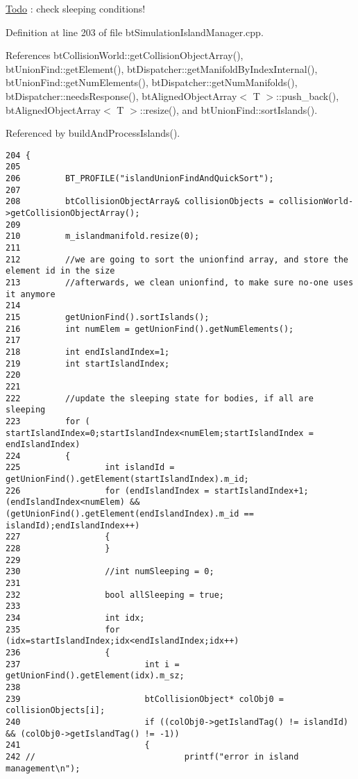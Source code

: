 \begin{Desc}
\item[\hyperlink{todo__todo000016}{Todo}]: check sleeping conditions! \end{Desc}


Definition at line 203 of file btSimulationIslandManager.cpp.

References btCollisionWorld::getCollisionObjectArray(), btUnionFind::getElement(), btDispatcher::getManifoldByIndexInternal(), btUnionFind::getNumElements(), btDispatcher::getNumManifolds(), btDispatcher::needsResponse(), btAlignedObjectArray$<$ T $>$::push\_\-back(), btAlignedObjectArray$<$ T $>$::resize(), and btUnionFind::sortIslands().

Referenced by buildAndProcessIslands().

\begin{Code}\begin{verbatim}204 {
205 
206         BT_PROFILE("islandUnionFindAndQuickSort");
207         
208         btCollisionObjectArray& collisionObjects = collisionWorld->getCollisionObjectArray();
209 
210         m_islandmanifold.resize(0);
211 
212         //we are going to sort the unionfind array, and store the element id in the size
213         //afterwards, we clean unionfind, to make sure no-one uses it anymore
214         
215         getUnionFind().sortIslands();
216         int numElem = getUnionFind().getNumElements();
217 
218         int endIslandIndex=1;
219         int startIslandIndex;
220 
221 
222         //update the sleeping state for bodies, if all are sleeping
223         for ( startIslandIndex=0;startIslandIndex<numElem;startIslandIndex = endIslandIndex)
224         {
225                 int islandId = getUnionFind().getElement(startIslandIndex).m_id;
226                 for (endIslandIndex = startIslandIndex+1;(endIslandIndex<numElem) && (getUnionFind().getElement(endIslandIndex).m_id == islandId);endIslandIndex++)
227                 {
228                 }
229 
230                 //int numSleeping = 0;
231 
232                 bool allSleeping = true;
233 
234                 int idx;
235                 for (idx=startIslandIndex;idx<endIslandIndex;idx++)
236                 {
237                         int i = getUnionFind().getElement(idx).m_sz;
238 
239                         btCollisionObject* colObj0 = collisionObjects[i];
240                         if ((colObj0->getIslandTag() != islandId) && (colObj0->getIslandTag() != -1))
241                         {
242 //                              printf("error in island management\n");

\end{verbatim}
\end{Code}

